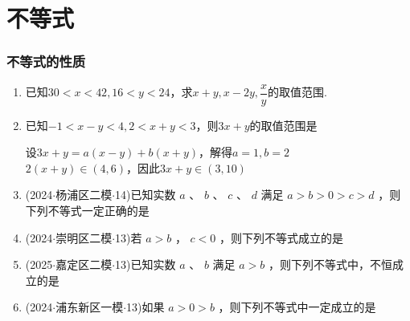 \chapter*{不等式}
\subsection*{不等式的性质}
\begin{enumerate}
    \item 已知$30 < x < 42, 16 < y < 24$，求$x+y, x-2y, \dfrac{x}{y}$的取值范围.
    \begin{jieda}
    \end{jieda}
    \item 已知$-1 < x-y < 4, 2 < x+y < 3$，则$3x+y$的取值范围是
    \begin{jieda}
        设$3x+y = a(x-y) + b(x+y)$，解得$a = 1, b = 2$ \\
        $2(x+y) \in (4, 6)$，因此$3x+y \in (3, 10)$
    \end{jieda}
    \item (2024$\cdot$杨浦区二模$\cdot$14)已知实数 $a$ 、 $b$ 、 $c$ 、 $d$ 满足 $a > b > 0 > c > d$ ，则下列不等式一定正确的是

    \item (2024$\cdot$崇明区二模$\cdot$13)若 $a > b$ ， $c < 0$ ，则下列不等式成立的是 

    \item (2025$\cdot$嘉定区二模$\cdot$13)已知实数 $a$ 、 $b$ 满足 $a > b$ ，则下列不等式中，不恒成立的是 

    \item (2024$\cdot$浦东新区一模$\cdot$13)如果 $a > 0 > b$ ，则下列不等式中一定成立的是 
\end{enumerate}

